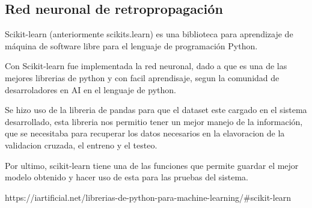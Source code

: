 \subsection{Red neuronal de retropropagación}
Scikit-learn (anteriormente scikits.learn) es una biblioteca para aprendizaje de máquina de software libre para el lenguaje de programación Python.

Con Scikit-learn fue implementada la red neuronal, dado a que es una de las mejores librerias de python y con facil aprendisaje, segun la comunidad de desarroladores en AI en el lenguaje de python.

Se hizo uso de la libreria de pandas para que el dataset este cargado en el sistema desarrollado, esta libreria nos permitio tener un mejor manejo de la información, que se necesitaba para recuperar los datos necesarios en la elavoracion de la validacion cruzada, el entreno y el testeo. 

Por ultimo, scikit-learn tiene una de las funciones que permite guardar el mejor modelo obtenido y hacer uso de esta para las pruebas del sistema.

https://iartificial.net/librerias-de-python-para-machine-learning/#scikit-learn


